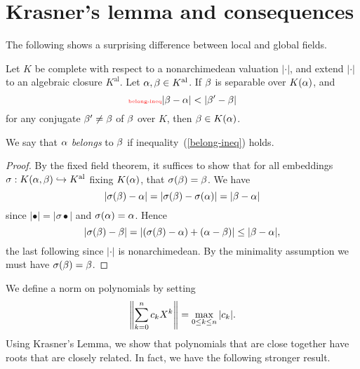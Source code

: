 \section{Krasner's lemma and consequences}
The following shows a surprising difference between local and global fields.
\begin{lem}
Let $K$ be complete with respect to a nonarchimedean valuation $|\cdot|$, and extend $|\cdot|$ to an algebraic closure $K^{\text{al}}$. Let $\alpha,\beta\in K^{\text{al}}$. If $\beta$ is separable over $K(\alpha)$, and
\begin{equation}\llabel{belong-ineq}
|\be-\al|<|\be'-\be|
\end{equation}
for any conjugate $\beta'\ne \beta$ of $\beta$ over $K$, then $\beta\in K(\alpha)$.
\end{lem}
We say that $\alpha$ {\it belongs} to $\beta$ if inequality~(\ref{belong-ineq}) holds.
\begin{proof}
By the fixed field theorem, it suffices to show that for all embeddings $\sigma:K(\alpha,\beta)\hookrightarrow K^{\text{al}}$ fixing $K(\alpha)$, that $\sigma(\beta)=\beta$. We have
\[
|\sigma(\beta)-\alpha|=|\sigma(\beta)-\sigma(\alpha)|=|\beta-\alpha|
\]
since $|\bullet|=|\sigma \bullet|$ and $\sigma(\alpha)=\alpha$. Hence
\[
|\sigma(\beta)-\beta|=|(\sigma(\beta)-\alpha)+(\alpha-\beta)|\le |\beta-\alpha|,
\]
the last following since $|\cdot|$ is nonarchimedean. By the minimality assumption we must have $\sigma(\beta)=\beta$.
\end{proof}
We define a norm on polynomials by setting
\[
\left\Vert {\sum_{k=0}^n c_kX^k}\right\Vert=\max_{0\le k\le n} |c_k|.
\]
Using Krasner's Lemma, we show that polynomials that are close together have roots that are closely related.
In fact, we have the following stronger result.
